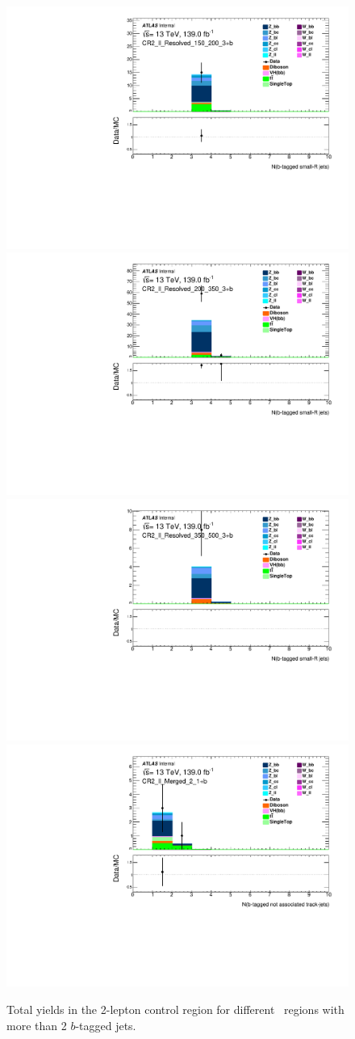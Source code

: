 \begin{figure}[!htb]
    \includegraphics[width=0.46\linewidth]{chapters/c8/figures/2L/DataMC_MonoH_Nominal_CR2_ll_Resolved_150_200_3+b_N_BJets_04.pdf}
    \includegraphics[width=0.46\linewidth]{chapters/c8/figures/2L/DataMC_MonoH_Nominal_CR2_ll_Resolved_200_350_3+b_N_BJets_04.pdf}\\
    \includegraphics[width=0.46\linewidth]{chapters/c8/figures/2L/DataMC_MonoH_Nominal_CR2_ll_Resolved_350_500_3+b_N_BJets_04.pdf}
    \includegraphics[width=0.46\linewidth]{chapters/c8/figures/2L/DataMC_MonoH_Nominal_CR2_ll_Merged_2_1+b_N_BTags_not_associated_02.pdf}
    \caption{Total yields in the 2-lepton control region for different \met~regions with more than 2 $b$-tagged jets.}
    \label{fig:data-mc-2l-ll-nb-3+b}
\end{figure}
